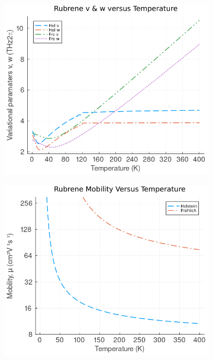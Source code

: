 \begin{figure}[!tbp]
\begin{subfigure}[b]{0.49\textwidth}
    \includegraphics[width=\textwidth]{figures/rubrene_vw_temp.png}
    \label{fig:rubene_vw_temp}
  \end{subfigure}
  \begin{subfigure}[b]{0.49\textwidth}
    \centering
    \includegraphics[width=\textwidth]{figures/rubrene_mobility_temp_plot.png}
    \label{fig:rubrene_mobility_temp}
  \end{subfigure}
  \hfill
  \begin{subfigure}[b]{0.49\textwidth}
    \centering

\end{subfigure}
\end{figure}
